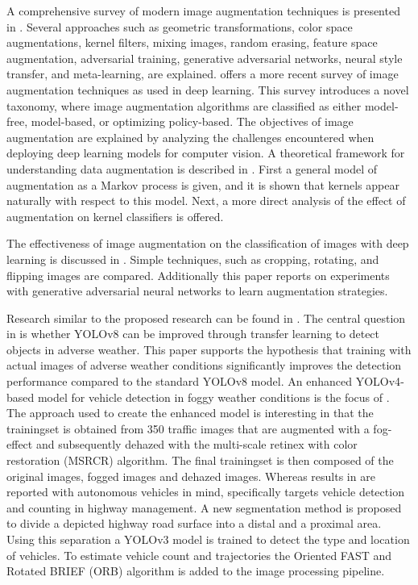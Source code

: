 \documentclass[]{article}
\begin{document}
	A comprehensive survey of modern image augmentation techniques is presented in \cite{shortenSurveyImageData2019}. Several approaches such as geometric transformations, color space augmentations, kernel filters, mixing images, random erasing, feature space augmentation, adversarial training, generative adversarial networks, neural style transfer, and meta-learning, are explained. \cite{xuComprehensiveSurveyImage2023} offers a more recent survey of image augmentation techniques as used in deep learning. This survey introduces a novel taxonomy, where image augmentation algorithms are classified as either model-free, model-based, or optimizing policy-based. The objectives of image augmentation are explained by analyzing the challenges encountered when deploying deep learning models for computer vision. A theoretical framework for understanding data augmentation is described in \cite{daoKernelTheoryModern2019}. First a general model of augmentation as a Markov process is given, and it is shown that kernels appear naturally with respect to this model. Next, a more direct analysis of the effect of augmentation on kernel classifiers is offered.
	
	The effectiveness of image augmentation on the classification of images with deep learning is discussed in \cite{perezEffectivenessDataAugmentation2017}. Simple techniques, such as cropping, rotating, and flipping images are compared. Additionally this paper reports on experiments with generative adversarial neural networks to learn augmentation strategies.
	
	Research similar to the proposed research can be found in \cite{kumarObjectDetectionAdverse2023}. The central question in \cite{kumarObjectDetectionAdverse2023} is whether YOLO{\small v8} can be improved through transfer learning to detect objects in adverse weather. This paper supports the hypothesis that training with actual images of adverse weather conditions significantly improves the detection performance compared to the standard YOLO{\small v8} model. An enhanced YOLO\small{v4}-based model for vehicle detection in foggy weather conditions is the focus of \cite{liVehicleDetectionFoggy2022}. The approach used to create the enhanced model is interesting in that the trainingset is obtained from 350 traffic images that are augmented with a fog-effect and subsequently dehazed with the multi-scale retinex with color restoration (MSRCR) algorithm. The final trainingset is then composed of the original images, fogged images and dehazed images. Whereas results in \cite{liVehicleDetectionFoggy2022} are reported with autonomous vehicles in mind, \cite{songVisionbasedVehicleDetection2019} specifically targets vehicle detection and counting in highway management.  A new segmentation method is proposed to divide a depicted highway road surface into a distal and a proximal area. Using this separation a YOLO{\small v3} model is trained to detect the type and location of vehicles. To estimate vehicle count and trajectories the Oriented FAST and Rotated BRIEF (ORB) algorithm is added to the image processing pipeline.
	
\end{document}
